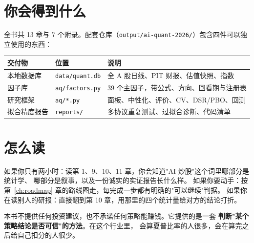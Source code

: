 \documentclass[UTF8,11pt,a4paper,openany,fontset=windows]{ctexbook}
\begin{document}
\section*{你会得到什么}

全书共 13 章与 7 个附录。配套仓库（\texttt{output/ai-quant-2026/}）包含四件可以独立使用的东西：

\begin{center}
\begin{tabular}{@{}lll@{}}
\toprule
交付物 & 位置 & 说明 \\
\midrule
本地数据库 & \texttt{data/quant.db} & 全 A 股日线、PIT 财报、估值快照、指数 \\
因子库 & \texttt{aq/factors.py} & 39 个主因子，带公式、方向、回看期与注册表 \\
研究框架 & \texttt{aq/*.py} & 面板、中性化、评价、CV、DSR/PBO、回测 \\
拟合精度报告 & \texttt{reports/} & 多协议重复测试、过拟合诊断、代码清单 \\
\bottomrule
\end{tabular}
\end{center}

\section*{怎么读}

如果你只有两小时：读第 1、9、10、11 章，你会知道"AI 炒股"这个词里哪部分是统计学、
哪部分是叙事，以及一份诚实的实证报告长什么样。
如果你要动手：按第~\ref{ch:roadmap} 章的路线图走，每完成一步都有明确的"可以继续"判据。
如果你在读别人的研报：直接翻到第 10 章，用那里的四个统计量给对方的结论打折。

\begin{keybox}[关于本书的立场]
本书不提供任何投资建议，也不承诺任何策略能赚钱。它提供的是一套
\textbf{判断"某个策略结论是否可信"的方法}。在这个行业里，
会算夏普比率的人很多，会在算完之后给自己扣分的人很少。
\end{keybox}

\clearpage
\tableofcontents
\clearpage

\mainmatter













\appendix





\end{document}
